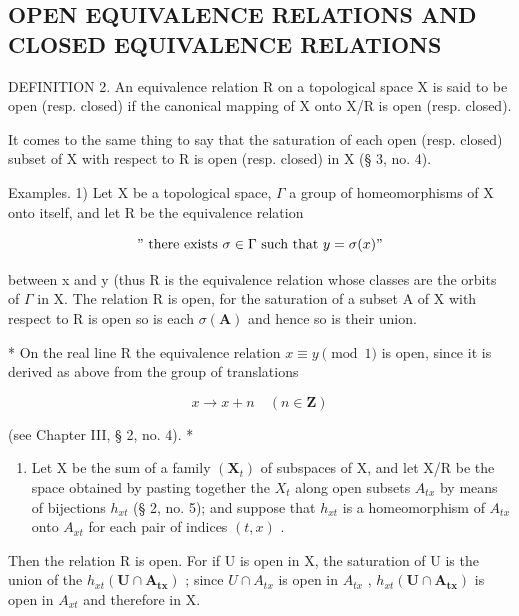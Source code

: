 \subsection{OPEN EQUIVALENCE RELATIONS AND CLOSED EQUIVALENCE RELATIONS}

DEFINITION 2. An equivalence relation R on a topological space X is said to be open (resp. closed) if the canonical mapping of X onto X/R is open (resp. closed).

It comes to the same thing to say that the saturation of each open (resp. closed) subset of X with respect to R is open (resp. closed) in X (§ 3, no. 4).

Examples. 1) Let X be a topological space, \(\Gamma\) a group of homeomorphisms of X onto itself, and let R be the equivalence relation

\[
" \text { there   exists } \sigma \in \Gamma \text { such   that } y = \sigma (x)"
\]

between x and y (thus R is the equivalence relation whose classes are the orbits of \(\Gamma\) in X. The relation R is open, for the saturation of a subset A of X with respect to R is open so is each \(\sigma(\mathbf{A})\) and hence so is their union.

* On the real line R the equivalence relation \(x \equiv y \pmod{1}\) is open, since it is derived as above from the group of translations

\[
x \rightarrow x + n \quad (n \in \mathbf {Z})
\]

(see Chapter III, § 2, no. 4). *

\begin{enumerate}
\def\labelenumi{\arabic{enumi})}
\setcounter{enumi}{1}
\tightlist
\item
  Let X be the sum of a family \((\mathbf{X}_{t})\) of subspaces of X, and let X/R be the space obtained by pasting together the \(X_{t}\) along open subsets \(A_{tx}\) by means of bijections \(h_{xt}\) (§ 2, no. 5); and suppose that \(h_{xt}\) is a homeomorphism of \(A_{tx}\) onto \(A_{xt}\) for each pair of indices \((t, x)\) .
\end{enumerate}

Then the relation R is open. For if U is open in X, the saturation of U is the union of the \(h_{xt}(\mathbf{U} \cap \mathbf{A}_{\mathbf{tx}})\) ; since \(U \cap A_{tx}\) is open in \(A_{tx}\) , \(h_{xt}(\mathbf{U} \cap \mathbf{A}_{\mathbf{tx}})\) is open in \(A_{xt}\) and therefore in X.

